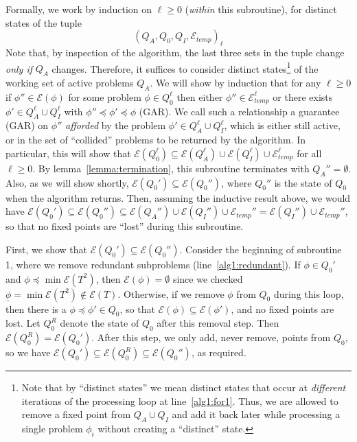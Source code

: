\documentclass[11pt,reqno]{amsart}
\theoremstyle{definition}
\numberwithin{equation}{section}
\newcommand{\ul}{\underline}
\newcommand{\pre}{\phi}
\newcommand{\sub}{\subseteq}
\newcommand{\fix}{\mathcal{E}}
\newcommand{\peq}{\preceq}
\newcommand{\bopre}{\ul{\pre}}
\newcommand{\acto}{Q_0}
\newcommand{\acta}{Q_A}
\newcommand{\actc}{Q_I}
\newcommand{\fixtemp}{\mathcal{E}_{temp}}
\begin{document}
Formally, we work by induction on $\ell \geq 0$ (\emph{within} this subroutine), for distinct states of the tuple \[(\acta,\acto,\actc,\fixtemp)_{\ell}\]
Note that, by inspection of the algorithm, the last three sets in the tuple change \emph{only if} $\acta$ changes. 
Therefore, it suffices to consider distinct states\footnote{Note that by ``distinct states'' we mean distinct states that occur at \emph{different} iterations of the processing loop at line~\ref{alg1:for1}.
Thus, we are allowed to remove a fixed point from $\acta \cup \actc$ and add it back later while processing a single problem $\pre_i$ without creating a ``distinct'' state.} of the working set of active problems $\acta$.
We will show by induction that for any $\ell \geq 0$ if $\pre'' \in \fix(\pre)$ for some problem $\pre \in \acto^{\ell}$ then either $\pre'' \in \fixtemp^{\ell}$ or there exists $\pre' \in \acta^{\ell} \cup \actc^{\ell}$ with $\pre'' \peq \pre' \peq \pre$ (GAR).
We call such a relationship a guarantee (GAR) on $\pre''$ \emph{afforded} by the problem $\pre' \in \acta^{\ell} \cup \actc^{\ell}$, which is either still active, or in the set of ``collided'' problems to be returned by the algorithm.
In particular, this will show that $\fix(\acto^{\ell}) \sub \fix(\acta^{\ell}) \cup \fix(\actc^{\ell}) \cup \fixtemp^{\ell}$ for all $\ell \geq 0$.
By lemma~\ref{lemma:termination}, this subroutine terminates with $\acta'' = \emptyset$. 
Also, as we will show shortly, $\fix(\acto') \sub \fix(\acto'')$, where $\acto''$ is the state of $\acto$ when the algorithm returns. 
Then, assuming the inductive result above, we would have $\fix(\acto') \sub \fix(\acto'') \sub \fix(\acta'') \cup \fix(\actc'') \cup \fixtemp'' = \fix(\actc'') \cup \fixtemp''$, so that no fixed points are ``lost'' during this subroutine.

First, we show that $\fix(\acto') \sub \fix(\acto'')$. 
Consider the beginning of subroutine 1, where we remove redundant subproblems (line~\ref{alg1:redundant}).
If $\pre \in \acto'$ and $\pre \peq \min \fix(T^2)$, then $\fix(\pre) = \emptyset$ since we checked $\bopre = \min \fix(T^2) \not \in \fix(T)$. 
Otherwise, if we remove $\pre$ from $\acto$ during this loop, then there is a $\pre \peq \pre' \in \acto$, so that $\fix(\pre) \sub \fix(\pre')$, and no fixed points are lost.
Let $\acto^R$ denote the state of $\acto$ after this removal step.
Then $\fix(\acto^R) = \fix(\acto')$.
After this step, we only add, never remove, points from $\acto$, so we have $\fix(\acto') \sub \fix(\acto^R) \sub \fix(\acto'')$, as required.
\end{document}
